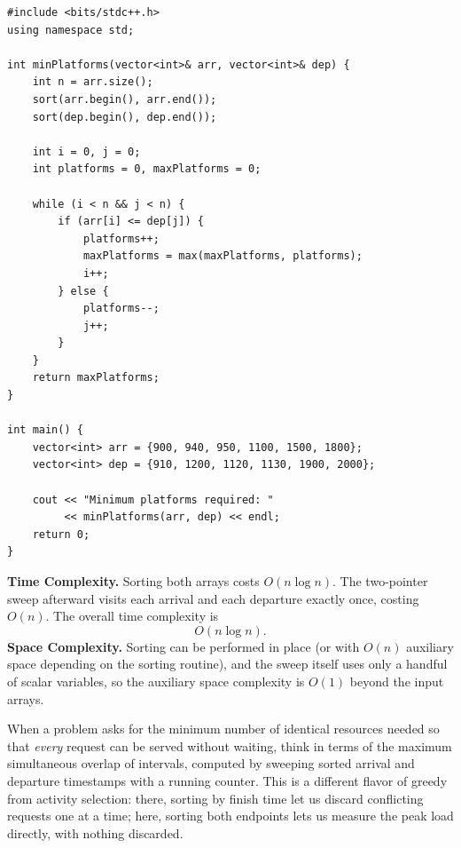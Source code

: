 \begin{lstlisting}
#include <bits/stdc++.h>
using namespace std;

int minPlatforms(vector<int>& arr, vector<int>& dep) {
    int n = arr.size();
    sort(arr.begin(), arr.end());
    sort(dep.begin(), dep.end());

    int i = 0, j = 0;
    int platforms = 0, maxPlatforms = 0;

    while (i < n && j < n) {
        if (arr[i] <= dep[j]) {
            platforms++;
            maxPlatforms = max(maxPlatforms, platforms);
            i++;
        } else {
            platforms--;
            j++;
        }
    }
    return maxPlatforms;
}

int main() {
    vector<int> arr = {900, 940, 950, 1100, 1500, 1800};
    vector<int> dep = {910, 1200, 1120, 1130, 1900, 2000};

    cout << "Minimum platforms required: "
         << minPlatforms(arr, dep) << endl;
    return 0;
}
\end{lstlisting}

\begin{complexitybox}
\textbf{Time Complexity.} Sorting both arrays costs $O(n \log n)$. The
two-pointer sweep afterward visits each arrival and each departure exactly
once, costing $O(n)$. The overall time complexity is
\[
  O(n \log n).
\]
\textbf{Space Complexity.} Sorting can be performed in place (or with
$O(n)$ auxiliary space depending on the sorting routine), and the sweep
itself uses only a handful of scalar variables, so the auxiliary space
complexity is $O(1)$ beyond the input arrays.
\end{complexitybox}

\begin{takeawaybox}
When a problem asks for the minimum number of identical resources needed so
that \emph{every} request can be served without waiting, think in terms of
the maximum simultaneous overlap of intervals, computed by sweeping sorted
arrival and departure timestamps with a running counter. This is a different
flavor of greedy from activity selection: there, sorting by finish time let
us discard conflicting requests one at a time; here, sorting both endpoints
lets us measure the peak load directly, with nothing discarded.
\end{takeawaybox}
